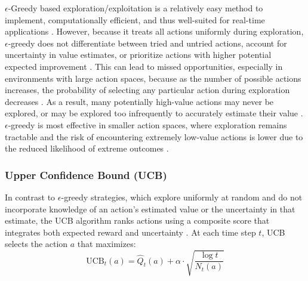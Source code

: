 \documentclass[final]{anthology-ch}         %
\begin{document}
 $\epsilon$-Greedy based exploration/exploitation is a relatively easy method to implement, computationally efficient, and thus well-suited for real-time applications \cite{Sutton1998, russell2016artificial}. However, because it treats all actions uniformly during exploration, $\epsilon$-greedy does not differentiate between tried and untried actions, account for uncertainty in value estimates, or prioritize actions with higher potential expected improvement \cite{Sutton1998, dulac2019challenges}. This can lead to missed opportunities, especially in environments with large action spaces, because as the number of possible actions increases, the probability of selecting any particular action during exploration decreases \cite{Sutton1998, bubeck2012regret}. As a result, many potentially high-value actions may never be explored, or may be explored too infrequently to accurately estimate their value \cite{Sutton1998, dulac2019challenges}. $\epsilon$-greedy is most effective in smaller action spaces, where exploration remains tractable and the risk of encountering extremely low-value actions is lower due to the reduced likelihood of extreme outcomes \cite{Sutton1998, dulac2019challenges}. \\
    
\subsubsection{\textbf{Upper Confidence Bound (UCB)}} In contrast to $\epsilon$-greedy strategies, which explore uniformly at random and do not incorporate knowledge of an action's estimated value or the uncertainty in that estimate, the UCB algorithm ranks actions using a composite score that integrates both expected reward and uncertainty \cite{auer2002finite}. At each time step $t$, UCB selects the action $a$ that maximizes:
\begin{equation}
    \text{UCB}_t(a) = \hat{Q}_t(a) + \alpha \cdot \sqrt{\frac{\log t}{N_t(a)}}
    \label{eq:ucb}
\end{equation}
\end{document}
